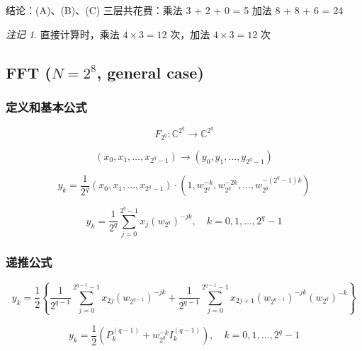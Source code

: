 \documentclass[12pt,a4paper]{article}
\numberwithin{subsection}{section}   %
\numberwithin{subsubsection}{subsection}
\theoremstyle{plain}
\theoremstyle{definition}
\theoremstyle{remark}
\newtheorem{remark}{注记}[subsection] %
\theoremstyle{remark}
\begin{document}
 结论：(A)、(B)、(C) 三层共花费：乘法 3 + 2 + 0 = 5 \quad 加法 8 + 8 + 6 = 24
	
	\begin{remark}
	直接计算时，乘法 $4 \times 3 = 12$ 次，加法 $4 \times 3 = 12$ 次
	\end{remark}

\subsection{FFT ($N = 2^8$, general case)}

\subsubsection{定义和基本公式}

\begin{equation}
	F_{2^q}: \mathbb{C}^{2^q} \rightarrow \mathbb{C}^{2^q}
\end{equation}

\begin{equation}
	(x_0, x_1, \ldots, x_{2^q -1}) \rightarrow (y_0, y_1, \ldots, y_{2^q -1})
\end{equation}

\begin{equation}
	y_k = \frac{1}{2^q} (x_0, x_1, \ldots, x_{2^q -1}) \cdot \left(1, w_{2^q}^{-k}, w_{2^q}^{-2k}, \ldots, w_{2^q}^{-(2^q -1)k}\right)
\end{equation}

\begin{equation}
	y_k = \frac{1}{2^q} \sum_{j=0}^{2^q -1} x_j \left(w_{2^q}\right)^{-jk}, \quad k = 0, 1, \ldots, 2^q -1
\end{equation}

\subsubsection{递推公式}

\begin{equation}
	y_k = \frac{1}{2} \left\{ \frac{1}{2^{q-1}} \sum_{j=0}^{2^{q-1} -1} x_{2j} \left(w_{2^{q-1}}\right)^{-jk} + \frac{1}{2^{q-1}} \sum_{j=0}^{2^{q-1} -1} x_{2j+1} \left(w_{2^{q-1}}\right)^{-jk} \left(w_{2^q}\right)^{-k} \right\}
\end{equation}

\begin{equation}
	y_k = \frac{1}{2} \left( P_k^{(q-1)} + w_{2^q}^{-k} I_k^{(q-1)} \right), \quad k = 0, 1, \ldots, 2^{q} -1
\end{equation}
\end{document}
